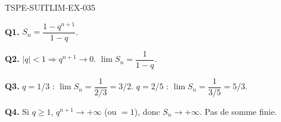 \begin{corrige}{TSPE-SUITLIM-EX-035}

\textbf{Q1.} $S_n = \dfrac{1-q^{n+1}}{1-q}$.

\textbf{Q2.} $|q|<1 \Rightarrow q^{n+1} \to 0$. $\lim S_n = \dfrac{1}{1-q}$.

\textbf{Q3.} $q=1/3$ : $\lim S_n = \dfrac{1}{2/3} = \boxed{3/2}$. $q=2/5$ : $\lim S_n = \dfrac{1}{3/5} = \boxed{5/3}$.

\textbf{Q4.} Si $q \geq 1$, $q^{n+1} \to +\infty$ (ou $= 1$), donc $S_n \to +\infty$. Pas de somme finie.

\end{corrige}
